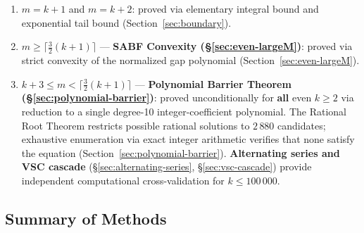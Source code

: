 \documentclass[12pt,a4paper]{article}
\theoremstyle{plain}
\theoremstyle{definition}
\begin{document}
\begin{enumerate}[label=(\arabic*), nosep]
  \item $m = k+1$ and $m = k+2$: proved via elementary integral bound
    and exponential tail bound (Section~\ref{sec:boundary}).
  \item $m \ge \lceil\frac{3}{2}(k+1)\rceil$ --- \textbf{SABF Convexity (\S\ref{sec:even-largeM})}:
    proved via strict convexity of the normalized gap polynomial
    (Section~\ref{sec:even-largeM}).
  \item $k+3 \le m < \lceil\frac{3}{2}(k+1)\rceil$ ---
    \textbf{Polynomial Barrier Theorem (\S\ref{sec:polynomial-barrier})}:
    proved unconditionally for \textbf{all} even $k \ge 2$ via
    reduction to a single degree-10 integer-coefficient polynomial.
    The Rational Root Theorem restricts possible rational solutions to
    $2\,880$ candidates; exhaustive enumeration via exact integer
    arithmetic verifies that none satisfy the equation
    (Section~\ref{sec:polynomial-barrier}).
    \textbf{Alternating series and VSC cascade} (\S\ref{sec:alternating-series}, \S\ref{sec:vsc-cascade}) provide independent computational cross-validation
    for $k \le 100\,000$.
\end{enumerate}

\subsection*{Summary of Methods}
\end{document}
